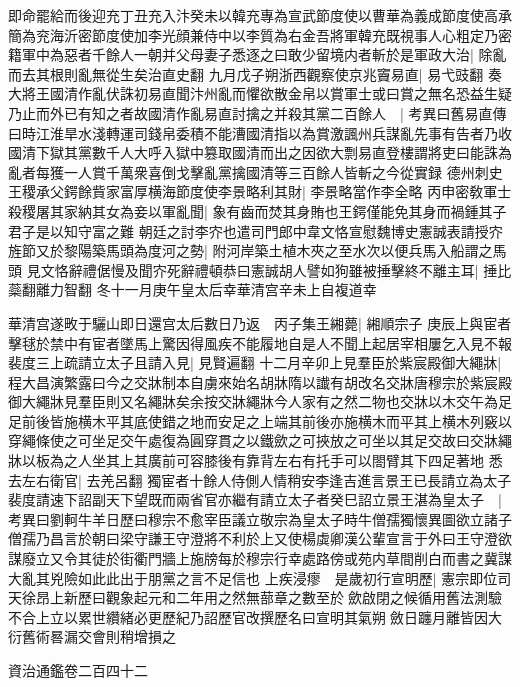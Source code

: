 即命罷給而後迎充丁丑充入汴癸未以韓充專為宣武節度使以曹華為義成節度使高承簡為兖海沂密節度使加李光顔兼侍中以李質為右金吾將軍韓充既視事人心粗定乃密籍軍中為惡者千餘人一朝并父母妻子悉逐之曰敢少留境内者斬於是軍政大治|{
	除亂而去其根則亂無從生矣治直史翻}
九月戊子朔浙西觀察使京兆竇易直|{
	易弋豉翻}
奏大將王國清作亂伏誅初易直聞汴州亂而懼欲散金帛以賞軍士或曰賞之無名恐益生疑乃止而外已有知之者故國清作亂易直討擒之并殺其黨二百餘人　|{
	考異曰舊易直傳曰時江淮旱水淺轉運司錢帛委積不能漕國清指以為賞激諷州兵謀亂先事有告者乃收國清下獄其黨數千人大呼入獄中篡取國清而出之因欲大剽易直登樓謂將吏曰能誅為亂者每獲一人賞千萬衆喜倒戈擊亂黨擒國清等三百餘人皆斬之今從實録}
德州刺史王稷承父鍔餘貲家富厚横海節度使李景略利其財|{
	李景略當作李全略}
丙申密敎軍士殺稷屠其家納其女為妾以軍亂聞|{
	象有齒而焚其身賄也王鍔僅能免其身而禍鍾其子君子是以知守富之難}
朝廷之討李㝏也遣司門郎中韋文恪宣慰魏博史憲誠表請授㝏旌節又於黎陽築馬頭為度河之勢|{
	附河岸築土植木夾之至水次以便兵馬入船謂之馬頭}
見文恪辭禮倨慢及聞㝏死辭禮頓恭曰憲誠胡人譬如狗雖被捶擊終不離主耳|{
	捶比蘂翻離力智翻}
冬十一月庚午皇太后幸華清宫辛未上自複道幸

華清宫遂畋于驪山即日還宫太后數日乃返　丙子集王緗薨|{
	緗順宗子}
庚辰上與宦者擊毬於禁中有宦者墜馬上驚因得風疾不能履地自是人不聞上起居宰相屢乞入見不報裴度三上疏請立太子且請入見|{
	見賢遍翻}
十二月辛卯上見羣臣於紫宸殿御大繩牀|{
	程大昌演繁露曰今之交牀制本自虜來始名胡牀隋以䜟有胡改名交牀唐穆宗於紫宸殿御大繩牀見羣臣則又名繩牀矣余按交牀繩牀今人家有之然二物也交牀以木交午為足足前後皆施横木平其底使錯之地而安足之上端其前後亦施横木而平其上横木列竅以穿繩條使之可坐足交午處復為圓穿貫之以鐵歛之可挾放之可坐以其足交故曰交牀繩牀以板為之人坐其上其廣前可容膝後有靠背左右有托手可以閤臂其下四足著地}
悉去左右衛官|{
	去羌呂翻}
獨宦者十餘人侍側人情稍安李逢吉進言景王已長請立為太子裴度請速下詔副天下望既而兩省官亦繼有請立太子者癸巳詔立景王湛為皇太子　|{
	考異曰劉軻牛羊日歷曰穆宗不愈宰臣議立敬宗為皇太子時牛僧孺獨懷異圖欲立諸子僧孺乃昌言於朝曰梁守謙王守澄將不利於上又使楊虡卿漢公輩宣言于外曰王守澄欲謀廢立又令其徒於街衢門牆上施牓每於穆宗行幸處路傍或苑内草間削白而書之冀謀大亂其兇險如此此出于朋黨之言不足信也}
上疾浸瘳　是歲初行宣明歷|{
	憲宗即位司天徐昂上新歷曰觀象起元和二年用之然無蔀章之數至於歛啟閉之候循用舊法測驗不合上立以累世纘緒必更歷紀乃詔歷官改撰歷名曰宣明其氣朔斂日躔月離皆因大衍舊術晷漏交會則稍增損之}


資治通鑑卷二百四十二

